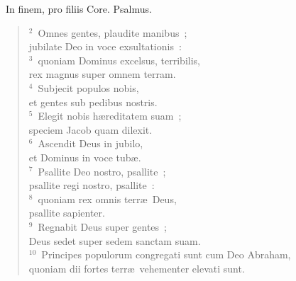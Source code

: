 ~\lettrine[lines=10,image=true,loversize=0.05,lraise=-0.03]{I}{}n finem, pro filiis Core. Psalmus.
\begin{flushleft}\begin{verse}\vspace{6pt}${}^{2}$~Omnes gentes, plaudite manibus~;\\ jubilate Deo in voce exsultationis~:\\
${}^{3}$~quoniam Dominus excelsus, terribilis,\\ rex magnus super omnem terram.\\
${}^{4}$~Subjecit populos nobis,\\ et gentes sub pedibus nostris.\\
${}^{5}$~Elegit nobis h\ae reditatem suam~;\\ speciem Jacob quam dilexit.\\
${}^{6}$~Ascendit Deus in jubilo,\\ et Dominus in voce tub\ae .\\
${}^{7}$~Psallite Deo nostro, psallite~;\\ psallite regi nostro, psallite~:\\
${}^{8}$~quoniam rex omnis terr\ae\ Deus,\\ psallite sapienter.\\
${}^{9}$~Regnabit Deus super gentes~;\\ Deus sedet super sedem sanctam suam.\\
${}^{10}$~Principes populorum congregati sunt cum Deo Abraham,\\ quoniam dii fortes terr\ae\ vehementer elevati sunt.\end{verse}\end{flushleft}



